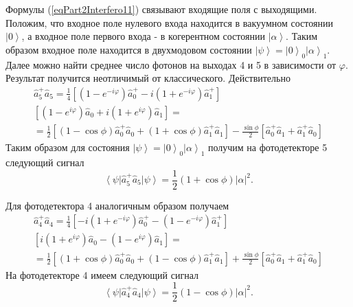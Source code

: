 Формулы (\ref{eqPart2Interfero11}) связывают входящие поля с
выходящими. Положим, что входное поле нулевого входа находится в
вакуумном состоянии $\left|0\right>$, а входное поле первого входа - в
когерентном состоянии $\left|\alpha\right>$. Таким образом входное
поле находится в двухмодовом состоянии $\left|\psi\right> =
\left|0\right>_0\left|\alpha\right>_1$. Далее можно найти
среднее число фотонов на выходах 4 и 5 в зависимости от
$\varphi$. Результат получится неотличимый от классического.
Действительно
\begin{eqnarray}
  \hat{a}_5^{+}\hat{a}_5 =
  \frac{1}{4}
  \left[
    \left(1 - e^{-i \varphi}\right)\hat{a}_0^{+} -
    i \left(1 + e^{-i \varphi}\right)\hat{a}_1^{+}
    \right]
  \nonumber \\
  \left[
    \left(1 - e^{i \varphi}\right)\hat{a}_0 +
    i \left(1 + e^{i \varphi}\right)\hat{a}_1
    \right] = 
  \nonumber \\
  = \frac{1}{2}
  \left[
    \left(
    1 -  \cos \phi 
    \right)
    \hat{a}_0^{+}\hat{a}_0 +
    \left(
    1 +  \cos \phi 
    \right)
    \hat{a}_1^{+}\hat{a}_1
    \right] -
  \frac{\sin \phi}{2}
  \left[
    \hat{a}_0^{+}\hat{a}_1 +
    \hat{a}_1^{+}\hat{a}_0
    \right]
  \label{eqPart2InterferoA55}
\end{eqnarray}
Таким образом для состояния $\left|\psi\right> =
\left|0\right>_0\left|\alpha\right>_1$ получим на фотодетекторе 5
следующий сигнал
\[
\left<\psi\right|\hat{a}^{+}_5 \hat{a}_5\left|\psi\right> =
\frac{1}{2}\left(1+\cos \phi \right) \left|\alpha\right|^2.
\]

Для фотодетектора 4 аналогичным образом получаем
\begin{eqnarray}
  \hat{a}_4^{+}\hat{a}_4 =
  \frac{1}{4}
  \left[
    - i \left(1 + e^{-i \varphi}\right)\hat{a}_0^{+} -
    \left(1 - e^{-i \varphi}\right)\hat{a}_1^{+}
    \right]
  \nonumber \\
  \left[
    i \left(1 + e^{i \varphi}\right)\hat{a}_0 -
    \left(1 - e^{i \varphi}\right)\hat{a}_1
    \right] = 
  \nonumber \\
  = \frac{1}{2}
  \left[
    \left(
    1 +  \cos \phi 
    \right)
    \hat{a}_0^{+}\hat{a}_0 +
    \left(
    1 -  \cos \phi 
    \right)
    \hat{a}_1^{+}\hat{a}_1
    \right] +
  \frac{\sin \phi}{2}
  \left[
    \hat{a}_0^{+}\hat{a}_1 +
    \hat{a}_1^{+}\hat{a}_0
    \right]
  \label{eqPart2InterferoA44}
\end{eqnarray}
На фотодетекторе 4 имеем
следующий сигнал
\[
\left<\psi\right|\hat{a}^{+}_4 \hat{a}_4\left|\psi\right> =
\frac{1}{2}\left(1-\cos \phi \right) \left|\alpha\right|^2.
\]

